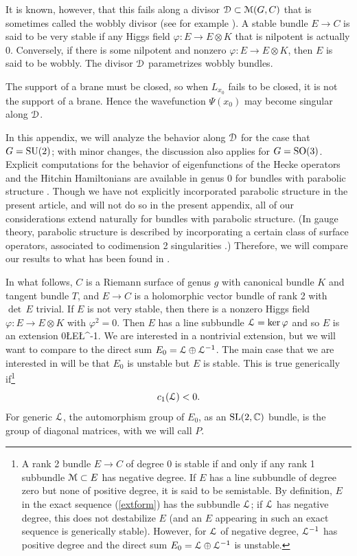 \documentclass[11pt,a4paper]{article}
\begin{document}
 It is known, however, that this fails along a divisor ${\mathcal D}\subset {\mathcal M}(G,C)$ that is sometimes called the wobbly divisor (see for example \cite{DP,PP,PPN,HZ}).   A stable bundle $E\to C$ is said to be very
 stable if any Higgs field $\varphi:E\to E\otimes K$ that is nilpotent is actually 0.   Conversely, if there is some nilpotent and nonzero $\varphi:E\to E\otimes K$,
 then $E$ is said to be wobbly.   The divisor ${\mathcal D}$ parametrizes wobbly bundles.  
 
  The support of a brane must be closed, so when $L_{x_0}$ fails
 to be closed, it is not the support of a brane.   Hence the wavefunction $\Psi(x_0)$ may become singular along ${\mathcal D}$.
 
 In this appendix, we will analyze the behavior along ${\mathcal D}$  for the case that $G={\mathrm{SU}}(2)$; with minor changes, the discussion also applies for
 $G={\mathrm{SO}}(3)$.     Explicit computations for the behavior of eigenfunctions of the Hecke operators and the Hitchin Hamiltonians are available in genus
 0 for bundles with parabolic structure \cite{EFK3}.   Though we have not explicitly incorporated parabolic structure in the present article, and will not
 do so in the present appendix,  all of our considerations extend naturally for bundles with parabolic structure.   (In gauge
 theory, parabolic structure is described by incorporating a certain class of surface operators, associated to codimension 2 singularities \cite{GuW2}.)
 Therefore, we will compare our results to what has been found in \cite{EFK3}.   
 
 In what follows, $C$ is a Riemann surface of genus $g$ with canonical bundle $K$ and tangent bundle $T$, and $E\to C$ is a holomorphic vector bundle of rank 2 with
 $\det\,E$ trivial.  
If $E$ is not very stable, then there is a nonzero Higgs field $\varphi:E\to E\otimes K$ with $\varphi^2=0$.   Then $E$ has a line subbundle ${\mathcal L}=\mathrm{ker}\,\varphi$ and
so $E$ is an extension
\be\label{extform} 0\to \L \to  E\to \L^{-1}.\ee
We are interested in a nontrivial extension, but we will want to compare to the direct sum $E_0={\mathcal L}\oplus {\mathcal L}^{-1}$.   The main case that we are interested in will be that $E_0$
is unstable but $E$ is stable.   This is true generically if\footnote{A rank 2 bundle $E\to C$ of degree 0 is stable if and only if
any rank 1 subbundle ${\mathcal M}\subset E$ has negative degree.  
 If $E$ has a line subbundle of degree zero but none of positive degree,
it is said to be semistable.
 By definition, $E$ in the exact sequence (\ref{extform}) has the subbundle ${\mathcal L}$; if ${\mathcal L}$ has
negative degree, this does not destabilize $E$ (and an $E$ appearing in such an exact sequence is generically stable).   However, for ${\mathcal L}$ of negative degree,
${\mathcal L}^{-1}$ has positive degree and the direct sum $E_0={\mathcal L}\oplus {\mathcal L}^{-1}$ is unstable.}
$$c_1({\mathcal L})<0. $$
For generic ${\mathcal L}$, the automorphism group of $E_0$, as an ${\mathrm{SL}}(2,{\mathbb C})$ bundle, is the group of diagonal matrices, with we will call $P$.
\end{document}
